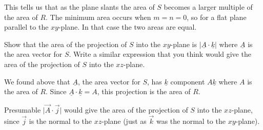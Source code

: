 \documentclass[12pt,letterpaper]{exam}
\newcommand{\mb}[1]{\underline{#1}}
\begin{document}
\begin{questions}
\begin{parts}
\begin{solution}
This tells us that as the plane slants the area of $S$ becomes a larger multiple of the area of $R$.  The minimum area occurs when $m = n = 0$, so for a flat plane parallel to the $xy$-plane.  In that case the two areas are equal.



\end{solution}
\item Show that the area of the projection of $S$ into the $xy$-plane is $\vert\mb A \cdot \mb k\vert$ where $\mb A$ is the area vector for $S$.  Write a similar expression that you think would give the area of the projection of $S$ into the $xz$-plane.
\begin{solution}

We found above that $\mb A$, the area vector for $S$, has $\mb k$ component $A\mb k$ where $A$ is the area of $R$.  Since $\mb A \cdot \mb k = A$, this projection is the area of $R$.

Presumable $\vert \vec A \cdot \vec j \vert$ would give the area of the projection of $S$ into the $xz$-plane, since $\vec j$ is the normal to the $xz$-plane (just as $\vec k$ was the normal to the $xy$-plane).
\end{solution}
\end{parts}








\end{questions}
\end{document}
